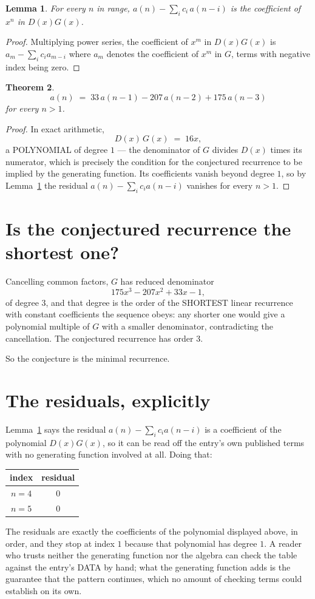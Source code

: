 \documentclass[11pt,a4paper]{article}
\theoremstyle{plain}
\newtheorem{theorem}{Theorem}
\newtheorem{lemma}[theorem]{Lemma}
\theoremstyle{definition}
\begin{document}
\begin{lemma}\label{lem:key}
For every $n$ in range, $a(n)-\sum_i c_i\,a(n-i)$ is the coefficient of $x^{n}$ in
$D(x)G(x)$.
\end{lemma}

\begin{proof}
Multiplying power series, the coefficient of $x^{m}$ in $D(x)G(x)$ is
$a_m-\sum_i c_i a_{m-i}$ where $a_m$ denotes the coefficient of $x^{m}$ in $G$, terms with
negative index being zero.
\end{proof}

\begin{theorem}
\[
a(n)\;=\;33\,a(n-1) - 207\,a(n-2) + 175\,a(n-3)
\]
for every $n>1$.
\end{theorem}

\begin{proof}
In exact arithmetic,
\[
D(x)\,G(x)\;=\;16 x,
\]
a POLYNOMIAL of degree $1$ --- the denominator of $G$ divides $D(x)$ times its numerator,
which is precisely the condition for the conjectured recurrence to be implied by the
generating function. Its coefficients vanish beyond degree $1$, so by
Lemma~\ref{lem:key} the residual $a(n)-\sum_ic_ia(n-i)$ vanishes for every
$n>1$.
\end{proof}

\section{Is the conjectured recurrence the shortest one?}

Cancelling common factors, $G$ has reduced denominator
\[
175 x^{3} - 207 x^{2} + 33 x - 1,
\]
of degree $3$, and that degree is the order of the SHORTEST linear recurrence with
constant coefficients the sequence obeys: any shorter one would give a polynomial multiple of
$G$ with a smaller denominator, contradicting the cancellation. The conjectured recurrence has
order $3$.

So the conjecture is the minimal recurrence.

\section{The residuals, explicitly}

Lemma~\ref{lem:key} says the residual $a(n)-\sum_ic_ia(n-i)$ is a coefficient of the
polynomial $D(x)G(x)$, so it can be read off the entry's own published terms with no
generating function involved at all. Doing that:
\begin{center}
\begin{tabular}{cc}
index & residual \\ \hline
$n=4$ & $0$ \\
$n=5$ & $0$
\end{tabular}
\end{center}
The residuals are exactly the coefficients of the polynomial displayed above, in order, and
they stop at index $1$ because that polynomial has degree $1$. A reader who trusts
neither the generating function nor the algebra can check the table against the entry's DATA
by hand; what the generating function adds is the guarantee that the pattern continues, which
no amount of checking terms could establish on its own.
\end{document}
